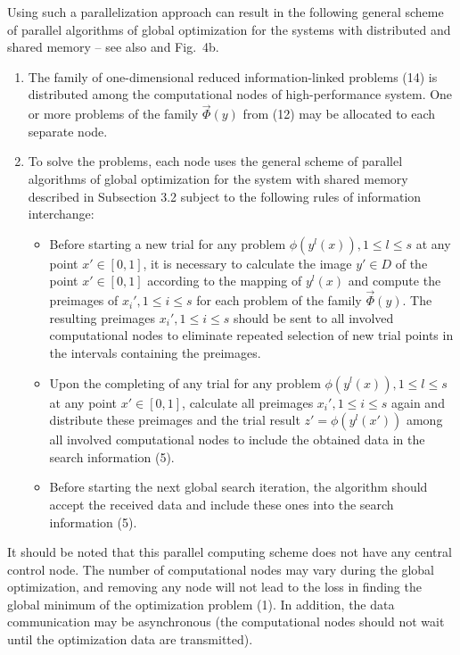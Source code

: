 \documentclass[
11pt,%
tightenlines,%
twoside,%
onecolumn,%
nofloats,%
nobibnotes,%
nofootinbib,%
superscriptaddress,%
noshowpacs,%
centertags]%
{revtex4}
\begin{document}
Using such a parallelization approach can result in the following general scheme of parallel algorithms of global optimization for the systems with distributed and shared memory -- see also \cite{Gergel1} and Fig.~4b.

\begin{enumerate}
\item The family of one-dimensional reduced information-linked problems (14) is distributed among the computational nodes of high-performance system. One or more problems of the family $\overrightarrow{\Phi}(y)$ from (12) may be allocated to each separate node.

\item To solve the problems, each node uses the general scheme of parallel algorithms of global optimization for the system with shared memory described in Subsection 3.2 subject to the following rules of information interchange:

\begin{itemize}
\item Before starting a new trial for any problem $\phi(y^l(x)), 1 \leq l \leq s$ at any point $x' \in [0,1]$, it is necessary to calculate the image $y' \in D$ of the point $x' \in [0,1]$ according to the mapping of $y^l(x)$ and compute the preimages of $x_i', 1 \leq i \leq s$ for each problem of the family $\overrightarrow{\Phi}(y)$. The resulting preimages $x_i', 1 \leq i \leq s$ should be sent to all involved computational nodes to eliminate repeated selection of new trial points in the intervals containing the preimages.

\item Upon the completing of any trial for any problem $\phi(y^l(x)), 1 \leq l \leq s$ at any point $x' \in [0,1]$, calculate all preimages $x_i', 1 \leq i \leq s$ again and distribute these preimages and the trial result $z' = \phi(y^l(x'))$ among all involved computational nodes to include the obtained data in the search information (5).

\item Before starting the next global search iteration, the algorithm should accept the received data and include these ones into the search information (5).
\end{itemize}
\end{enumerate}

It should be noted that this parallel computing scheme does not have any central control node. The number of computational nodes may vary during the global optimization, and removing any node will not lead to the loss in finding the global minimum of the optimization problem (1). In addition, the data communication may be asynchronous (the computational nodes should not wait until the optimization data are transmitted).
\end{document}
